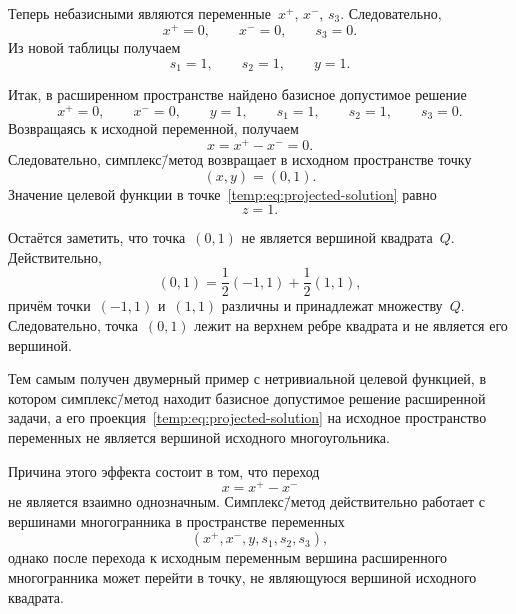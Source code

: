Теперь небазисными являются переменные~$x^+$, $x^-$, $s_3$.
Следовательно,
\begin{equation*}
  x^+ = 0,
  \qquad
  x^- = 0,
  \qquad
  s_3 = 0.
\end{equation*}
Из новой таблицы получаем
\begin{equation*}
  s_1 = 1,
  \qquad
  s_2 = 1,
  \qquad
  y = 1.
\end{equation*}

Итак, в расширенном пространстве найдено базисное допустимое решение
\begin{equation*}
  x^+ = 0,
  \qquad
  x^- = 0,
  \qquad
  y = 1,
  \qquad
  s_1 = 1,
  \qquad
  s_2 = 1,
  \qquad
  s_3 = 0.
\end{equation*}
Возвращаясь к исходной переменной, получаем
\begin{equation}
  x = x^+ - x^- = 0.
  \label{temp:eq:x-recovery}
\end{equation}
Следовательно, симплекс\=/метод возвращает в исходном пространстве точку
\begin{equation}
  (x, y) = (0, 1).
  \label{temp:eq:projected-solution}
\end{equation}
Значение целевой функции в точке~\eqref{temp:eq:projected-solution} равно
\begin{equation*}
  z = 1.
\end{equation*}

Остаётся заметить, что точка~$(0, 1)$ не является вершиной квадрата~$Q$.
Действительно,
\begin{equation*}
  (0, 1) = \frac{1}{2}(-1, 1) + \frac{1}{2}(1, 1),
\end{equation*}
причём точки~$(-1, 1)$ и~$(1, 1)$ различны и принадлежат множеству~$Q$.
Следовательно, точка~$(0, 1)$ лежит на верхнем ребре квадрата и не является его вершиной.

Тем самым получен двумерный пример с нетривиальной целевой функцией, в котором симплекс\=/метод находит базисное допустимое решение расширенной задачи, а его проекция~\eqref{temp:eq:projected-solution} на исходное пространство переменных не является вершиной исходного многоугольника.

Причина этого эффекта состоит в том, что переход
\begin{equation*}
  x = x^+ - x^-
\end{equation*}
не является взаимно однозначным.
Симплекс\=/метод действительно работает с вершинами многогранника в пространстве переменных
\begin{equation*}
  (x^+, x^-, y, s_1, s_2, s_3),
\end{equation*}
однако после перехода к исходным переменным вершина расширенного многогранника может перейти в точку, не являющуюся вершиной исходного квадрата.
